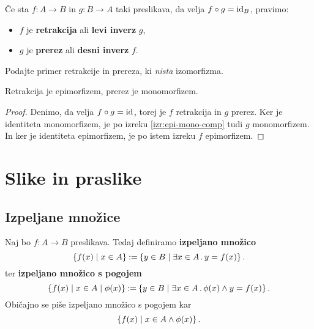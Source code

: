 \begin{definicija}
  Če sta $f : A \to B$ in $g : B \to A$ taki preslikava, da velja $f \circ g = \id[B]$, pravimo:
  \begin{itemize}
  \item $f$ je \textbf{retrakcija} ali \textbf{levi inverz} $g$,
  \item $g$ je \textbf{prerez} ali \textbf{desni inverz} $f$.
  \end{itemize}
\end{definicija}

\begin{vaja}
  Podajte primer retrakcije in prereza, ki \emph{nista} izomorfizma.
\end{vaja}

\begin{izrek}
  Retrakcija je epimorfizem, prerez je monomorfizem.
\end{izrek}

\begin{proof}
  Denimo, da velja $f \circ g = \id$, torej je $f$ retrakcija in $g$ prerez. Ker je identiteta monomorfizem, je po izreku \ref{izr:epi-mono-comp} tudi $g$ monomorfizem. In ker je identiteta epimorfizem, je po istem izreku $f$ epimorfizem.
\end{proof}

\section{Slike in praslike}

\subsection{Izpeljane množice}

Naj bo $f : A \to B$ preslikava. Tedaj definiramo \textbf{izpeljano množico}
%
\begin{equation*}
  \set{ f(x) \such x \in A }
  \defeq \set{ y \in B \such \some{x \in A} y = f(x) }.
\end{equation*}
%
ter \textbf{izpeljano množico s pogojem}
%
\begin{equation*}
  \set{ f(x) \such x \in A \such \phi(x) }
  \defeq \set{ y \in B \such \some{x \in A} \phi(x) \land y = f(x) }.
\end{equation*}
%
Običajno se piše izpeljano množico s pogojem kar
%
\begin{equation*}
  \set{ f(x) \such x \in A \land \phi(x) }.
\end{equation*}


